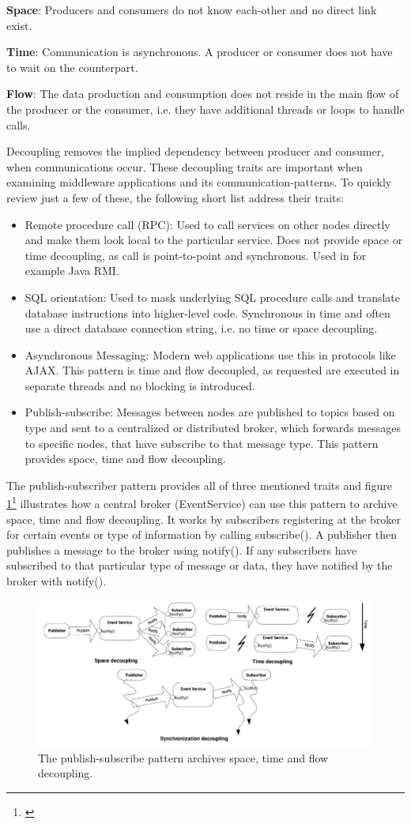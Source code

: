 \noindent \textbf{Space}: Producers and consumers do not know each-other and no direct link exist.

\noindent \textbf{Time}: Communication is asynchronous. A producer or consumer does not have to wait on the counterpart.

\noindent \textbf{Flow}: The data production and consumption does not reside in the main flow of the producer or the consumer, i.e. they have additional threads or loops to handle calls.

\noindent Decoupling removes the implied dependency between producer and consumer, when communications occur. These decoupling traits are important when examining middleware applications and its communication-patterns. To quickly review just a few of these, the following short list address their traits:

\begin{itemize}
	\item Remote procedure call (RPC): Used to call services on other nodes directly and make them look local to the particular service. Does not provide space or time decoupling, as call is point-to-point and synchronous. Used in for example Java RMI.
	\item SQL orientation: Used to mask underlying SQL procedure calls and translate database instructions into higher-level code. Synchronous in time and often use a direct database connection string, i.e. no time or space decoupling.
	\item Asynchronous Messaging: Modern web applications use this in protocols like AJAX. This pattern is time and flow decoupled, as requested are executed in separate threads and no blocking is introduced.
	\item Publish-subscribe: Messages between nodes are published to topics based on type and sent to a centralized or distributed broker, which forwards messages to specific nodes, that have subscribe to that message type. This pattern provides space, time and flow decoupling.
\end{itemize}

\noindent The publish-subscriber pattern provides all of three mentioned traits and figure \ref{fig:pubsub}\footnote{\cite{Eugster2003}} illustrates how a central broker (EventService) can use this pattern to archive space, time and flow decoupling. It works by subscribers registering at the broker for certain events or type of information by calling subscribe(). A publisher then publishes a message to the broker using notify(). If any subscribers have subscribed to that particular type of message or data, they have notified by the broker with notify().

\begin{figure}[H]
	\centering
	\includegraphics[scale=0.6]{middleware/pubsub.png}
	\caption{The publish-subscribe pattern archives space, time and flow decoupling.}
	\label{fig:pubsub}
\end{figure}